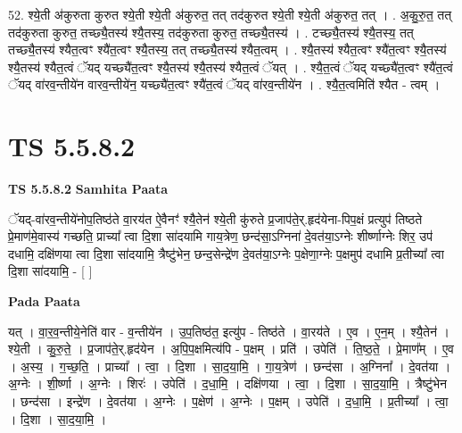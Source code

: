 \documentclass[17pt]{extarticle}
\begin{document}
52. श्ये॒ती अ॑कुरुता कुरुत श्ये॒ती श्ये॒ती अ॑कुरुत॒ तत् तद॑कुरुत श्ये॒ती श्ये॒ती अ॑कुरुत॒ तत् । . अ॒कु॒रु॒त॒ तत् तद॑कुरुता कुरुत॒ तच्छ्यै॒तस्य॑ श्यै॒तस्य॒ तद॑कुरुता कुरुत॒ तच्छ्यै॒तस्य॑ । . टच्छ्यै॒तस्य॑ श्यै॒तस्य॒ तत् तच्छ्यै॒तस्य॑ श्यैत॒त्वꣳ श्यै॑त॒त्वꣳ श्यै॒तस्य॒ तत् तच्छ्यै॒तस्य॑ श्यैत॒त्वम् । . श्यै॒तस्य॑ श्यैत॒त्वꣳ श्यै॑त॒त्वꣳ श्यै॒तस्य॑ श्यै॒तस्य॑ श्यैत॒त्वं ॅयद् यच्छ्यै॑त॒त्वꣳ श्यै॒तस्य॑ श्यै॒तस्य॑ श्यैत॒त्वं ॅयत् । . श्यै॒त॒त्वं ॅयद् यच्छ्यै॑त॒त्वꣳ श्यै॑त॒त्वं ॅयद् वा॑रव॒न्तीये॑न वारव॒न्तीये॑न॒ यच्छ्यै॑त॒त्वꣳ श्यै॑त॒त्वं ॅयद् वा॑रव॒न्तीये॑न । . श्यै॒त॒त्वमिति॑ श्यैत - त्वम् । \newline
\pagebreak
{}

\section{ TS 5.5.8.2 }

\textbf{TS 5.5.8.2 } \newline
\textbf{Samhita Paata} \newline

ॅयद्-वा॑रव॒न्तीये॑नोप॒तिष्ठ॑ते वा॒रय॑त ऐ॒वैनꣳ॑ श्यै॒तेन॑ श्ये॒ती कु॑रुते प्र॒जाप॑ते॒र्.हृद॑येना-पिप॒क्षं प्रत्युप॑ तिष्ठते प्रे॒माण॑मे॒वास्य॑ गच्छति॒ प्राच्या᳚ त्वा दि॒शा सा॑दयामि गाय॒त्रेण॒ छन्द॑सा॒ऽग्निना॑ दे॒वत॑या॒ऽग्नेः शीर्ष्णाग्नेः शिर॒ उप॑ दधामि॒ दक्षि॑णया त्वा दि॒शा सा॑दयामि॒ त्रैष्टु॑भेन॒ छन्द॒सेन्द्रे॑ण दे॒वत॑या॒ऽग्नेः प॒क्षेणा॒ग्नेः प॒क्षमुप॑ दधामि प्र॒तीच्या᳚ त्वा दि॒शा सा॑दयामि॒ - [  ] \newline

\textbf{Pada Paata} \newline

यत् । वा॒र॒व॒न्तीये॒नेति॑ वार - व॒न्तीये॑न । उ॒प॒तिष्ठ॑त॒ इत्यु॑प - तिष्ठ॑ते । वा॒रय॑ते । ए॒व । ए॒न॒म् । श्यै॒तेन॑ । श्ये॒ती । कु॒रु॒ते॒ । प्र॒जाप॑ते॒र्.हृद॑येन । अ॒पि॒प॒क्षमित्य॑पि - प॒क्षम् । प्रति॑ । उपेति॑ । ति॒ष्ठ॒ते॒ । प्रे॒माण᳚म् । ए॒व । अ॒स्य॒ । ग॒च्छ॒ति॒ । प्राच्या᳚ । त्वा॒ । दि॒शा । सा॒द॒या॒मि॒ । गा॒य॒त्रेण॑ । छन्द॑सा । अ॒ग्निना᳚ । दे॒वत॑या । अ॒ग्नेः । शी॒र्ष्णा । अ॒ग्नेः । शिरः॑ । उपेति॑ । द॒धा॒मि॒ । दक्षि॑णया । त्वा॒ । दि॒शा । सा॒द॒या॒मि॒ । त्रैष्टु॑भेन । छन्द॑सा । इन्द्रे॑ण । दे॒वत॑या । अ॒ग्नेः । प॒क्षेण॑ । अ॒ग्नेः । प॒क्षम् । उपेति॑ । द॒धा॒मि॒ । प्र॒तीच्या᳚ । त्वा॒ । दि॒शा । सा॒द॒या॒मि॒ ।  \newline
\end{document}

